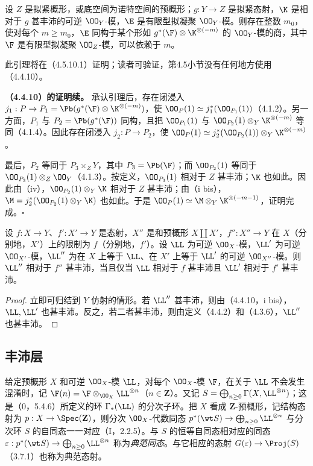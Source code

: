 设 $Z$ 是拟紧概形，或底空间为诺特空间的预概形；$g:Y\to Z$ 是拟紧态射，$\K$ 是相对于 $g$ 甚丰沛的可逆 $\OO_Y$-模，$\E$ 是有限型拟凝聚 $\OO_Y$-模。则存在整数 $m_0$，使对每个 $m\geq m_0$，$\E$ 同构于某个形如 $g^*(\F)\otimes\K^{\otimes(-m)}$ 的 $\OO_Y$-模的商，其中 $\F$ 是有限型拟凝聚 $\OO_Z$-模，可以依赖于 $m$。

此引理将在（4.5.10.1）证明；读者可验证，第4.5小节没有任何地方使用（4.4.10）。

\noindent\textbf{（4.4.10）的证明续。}
承认引理后，存在闭浸入
$j_1:P\to P_1=\Pb(g^*(\F)\otimes\K^{\otimes(-m)})$，使
$\OO_P(1)\simeq j_1^*(\OO_{P_1}(1))$（4.1.2）。另一方面，$P_1$ 与 $P_2=\Pb(g^*(\F))$ 同构，且把 $\OO_{P_1}(1)$ 与 $\OO_{P_2}(1)\otimes_Y\K^{\otimes(-m)}$ 等同（4.1.4）。因此存在闭浸入 $j_2:P\to P_2$，使
$\OO_P(1)\simeq j_2^*(\OO_{P_2}(1))\otimes_Y\K^{\otimes(-m)}$。

最后，$P_2$ 等同于 $P_3\times_Z Y$，其中 $P_3=\Pb(\F)$；而 $\OO_{P_2}(1)$ 等同于 $\OO_{P_3}(1)\otimes_Z\OO_Y$（4.1.3）。按定义，$\OO_{P_3}(1)$ 相对于 $Z$ 甚丰沛；$\K$ 也如此。因此由（iv），$\OO_{P_2}(1)\otimes_Y\K$ 相对于 $Z$ 甚丰沛；由（i bis），
$\M=j_2^*(\OO_{P_2}(1)\otimes_Y\K)$ 也如此。于是
$\OO_P(1)\simeq\M\otimes_Y\K^{\otimes(-m-1)}$，证明完成。\hfill$\square$

设 $f:X\to Y$、$f':X'\to Y$ 是态射，$X''$ 是和预概形 $X\amalg X'$，$f'':X''\to Y$ 在 $X$（分别地，$X'$）上的限制为 $f$（分别地，$f'$）。设 $\LL$ 为可逆 $\OO_X$-模，$\LL'$ 为可逆 $\OO_{X'}$-模，$\LL''$ 为在 $X$ 上等于 $\LL$、在 $X'$ 上等于 $\LL'$ 的可逆 $\OO_{X''}$-模。则 $\LL''$ 相对于 $f''$ 甚丰沛，当且仅当 $\LL$ 相对于 $f$ 甚丰沛且 $\LL'$ 相对于 $f'$ 甚丰沛。
\begin{proof}
立即可归结到 $Y$ 仿射的情形。若 $\LL''$ 甚丰沛，则由（4.4.10，i bis），$\LL,\LL'$ 也甚丰沛。反之，若二者甚丰沛，则由定义（4.4.2）和（4.3.6），$\LL''$ 也甚丰沛。
\end{proof}

\subsection{丰沛层}

给定预概形 $X$ 和可逆 $\OO_X$-模 $\LL$，对每个 $\OO_X$-模 $\F$，在关于 $\LL$ 不会发生混淆时，记
$\F(n)=\F\otimes_{\OO_X}\LL^{\otimes n}$（$n\in\mathbf Z$）。又记
$S=\bigoplus_{n\geq0}\Gamma(X,\LL^{\otimes n})$；这是（0，5.4.6）所定义的环 $\Gamma_*(\LL)$ 的分次子环。把 $X$ 看成 $\mathbf Z$-预概形，记结构态射为 $p:X\to\Spec(\mathbf Z)$，则分次 $\OO_X$-代数同态
$p^*(\wt S)\to\bigoplus_{n\geq0}\LL^{\otimes n}$ 与分次环 $S$ 的自同态一一对应（I，2.2.5）。与 $S$ 的恒等自同态相对应的同态
$\varepsilon:p^*(\wt S)\to\bigoplus_{n\geq0}\LL^{\otimes n}$ 称为\emph{典范同态}。与它相应的态射 $G(\varepsilon)\to\Proj(S)$（3.7.1）也称为典范态射。

